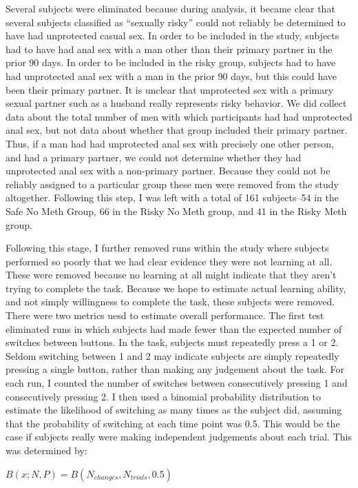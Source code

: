 \documentclass[]{article}
\begin{document}
Several subjects were eliminated because during analysis, it became
clear that several subjects classified as ``sexually risky'' could not
reliably be determined to have had unprotected casual sex. In order to
be included in the study, subjects had to have had anal sex with a man
other than their primary partner in the prior 90 days. In order to be
included in the risky group, subjects had to have had unprotected anal
sex with a man in the prior 90 days, but this could have been their
primary partner. It is unclear that unprotected sex with a primary
sexual partner such as a husband really represents risky behavior. We
did collect data about the total number of men with which participants
had had unprotected anal sex, but not data about whether that group
included their primary partner. Thus, if a man had had unprotected anal
sex with precisely one other person, and had a primary partner, we could
not determine whether they had unprotected anal sex with a non-primary
partner. Because they could not be reliably assigned to a particular
group these men were removed from the study altogether. Following this
step, I was left with a total of 161 subjects--54 in the Safe No Meth
Group, 66 in the Risky No Meth group, and 41 in the Risky Meth group.

Following this stage, I further removed runs within the study where
subjects performed so poorly that we had clear evidence they were not
learning at all. These were removed because no learning at all might
indicate that they aren't trying to complete the task. Because we hope
to estimate actual learning ability, and not simply willingness to
complete the task, these subjects were removed. There were two metrics
uesd to estimate overall performance. The first test eliminated runs in
which subjects had made fewer than the expected number of switches
between buttons. In the task, subjects must repeatedly press a 1 or 2.
Seldom switching between 1 and 2 may indicate subjects are simply
repeatedly pressing a single button, rather than making any judgement
about the task. For each run, I counted the number of switches between
consecutively pressing 1 and consecutively pressing 2. I then used a
binomial probability distribution to estimate the likelihood of
switching as many times as the subject did, assuming that the
probability of switching at each time point was 0.5. This would be the
case if subjects really were making independent judgements about each
trial. This was determined by:

\(B(x; N, P) = B(N_{changes},N_{trials},0.5)\)
\end{document}
